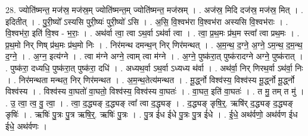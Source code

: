 \documentclass[17pt]{extarticle}
\begin{document}
28. ज्योति॑ष्मन्त॒ मज॑स्र॒ मज॑स्र॒म् ज्योति॑ष्मन्त॒म् ज्योति॑ष्मन्त॒ मज॑स्रम् । . अज॑स्र॒ मिदि दज॑स्र॒ मज॑स्र॒ मित् । . इदितीत् । . पु॒री॒ष्यो᳚ ऽस्यसि पुरी॒ष्यः॑ पुरी॒ष्यो॑ ऽसि । . अ॒सि॒ वि॒श्वभ॑रा वि॒श्वभ॑रा अस्यसि वि॒श्वभ॑राः । . वि॒श्वभ॑रा॒ इति॑ वि॒श्व - भ॒राः॒ । . अथ॑र्वा त्वा॒ त्वा ऽथ॒र्वा ऽथ॑र्वा त्वा । . त्वा॒ प्र॒थ॒मः प्र॑थ॒म स्त्वा᳚ त्वा प्रथ॒मः । . प्र॒थ॒मो निर् णिष् प्र॑थ॒मः प्र॑थ॒मो निः । . निर॑मन्थ दमन्थ॒न् निर् णिर॑मन्थत् । . अ॒म॒न्थ॒ द॒ग्ने॒ अ॒ग्ने॒ ऽम॒न्थ॒ द॒म॒न्थ॒ द॒ग्ने॒ । . अ॒ग्न॒ इत्य॑ग्ने । . त्वा म॑ग्ने अग्ने॒ त्वाम् त्वा म॑ग्ने । . अ॒ग्ने॒ पुष्क॑रा॒त् पुष्क॑रादग्ने अग्ने॒ पुष्क॑रात् । . पुष्क॑रा॒ दध्यधि॒ पुष्क॑रा॒त् पुष्क॑रा॒ दधि॑ । . अध्यथ॒र्वा ऽथ॒र्वा ऽध्यध्य थ॑र्वा । . अथ॑र्वा॒ निर् णिरथ॒र्वा ऽथ॑र्वा॒ निः । . निर॑मन्थता मन्थत॒ निर् णिर॑मन्थत । . अ॒म॒न्थ॒तेत्य॑मन्थत । . मू॒र्द्ध्नो विश्व॑स्य॒ विश्व॑स्य मू॒र्द्ध्नो मू॒र्द्ध्नो विश्व॑स्य । . विश्व॑स्य वा॒घतो॑ वा॒घतो॒ विश्व॑स्य॒ विश्व॑स्य वा॒घतः॑ । . वा॒घत॒ इति॑ वा॒घतः॑ । . त मु॒ तम् त मु॑ । . उ॒ त्वा॒ त्व॒ वु॒ त्वा॒ । . त्वा॒ द॒द्ध्यङ् द॒द्ध्यङ् त्वा᳚ त्वा द॒द्ध्यङ् । . द॒द्ध्यङ् ङृषि॒र्॒. ऋषि॑र् द॒द्ध्यङ् द॒द्ध्यङ् ङृषिः॑ । . ऋषिः॑ पु॒त्रः पु॒त्र ऋषि॒र्॒. ऋषिः॑ पु॒त्रः । . पु॒त्र ई॑ध ईधे पु॒त्रः पु॒त्र ई॑धे । . ई॒धे॒ अथ॑र्वणो॒ अथ॑र्वण ईध ईधे॒ अथ॑र्वणः । \newline
\end{document}
